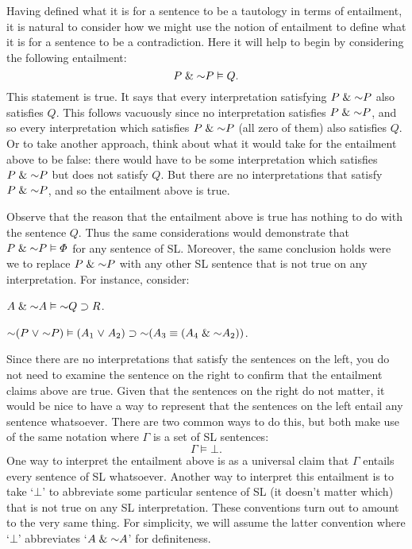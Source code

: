 Having defined what it is for a sentence to be a tautology in terms of entailment, it is natural to consider how we might use the notion of entailment to define what it is for a sentence to be a contradiction.
Here it will help to begin by considering the following entailment:
$$P \eand \enot P \models Q.$$
This statement is true.
It says that every interpretation satisfying $P \eand \enot P$ also satisfies $Q$.
This follows vacuously since no interpretation satisfies $P \eand \enot P$, and so every interpretation which satisfies $P \eand \enot P$ (all zero of them) also satisfies $Q$.
Or to take another approach, think about what it would take for the entailment above to be false: there would have to be some interpretation which satisfies $P \eand \enot P$ but does not satisfy $Q$.
But there are no interpretations that satisfy $P \eand \enot P$, and so the entailment above is true.

Observe that the reason that the entailment above is true has nothing to do with the sentence $Q$.
Thus the same considerations would demonstrate that $P \eand \enot P \models \metaA{}$ for any sentence \metaA{} of SL.
Moreover, the same conclusion holds were we to replace $P \eand \enot P$ with any other SL sentence that is not true on any interpretation.
For instance, consider:

\begin{earg}
\item[] $A \eand \enot A \models \enot Q \eif R$.
\item[] $\enot (P \eor \enot P) \models (A_1 \eor A_2) \eif \enot (A_3 \eiff (A_4 \eand \enot A_2))$.
\end{earg}

Since there are no interpretations that satisfy the sentences on the left, you do not need to examine the sentence on the right to confirm that the entailment claims above are true.
Given that the sentences on the right do not matter, it would be nice to have a way to represent that the sentences on the left entail any sentence whatsoever.
There are two common ways to do this, but both make use of the same notation where $\Gamma$ is a set of SL sentences:
$$\Gamma \models \bot.$$
One way to interpret the entailment above is as a universal claim that $\Gamma$ entails every sentence of SL whatsoever. 
Another way to interpret this entailment is to take `$\bot$' to abbreviate some particular sentence of SL (it doesn't matter which) that is not true on any SL interpretation.
These conventions turn out to amount to the very same thing.
For simplicity, we will assume the latter convention where `$\bot$' abbreviates `$A \eand \enot A$' for definiteness.

